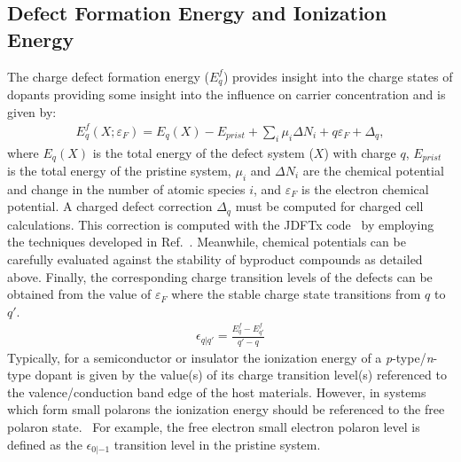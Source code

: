 \subsection{Defect Formation Energy and Ionization Energy}
The charge defect formation energy ($E^f_q$) provides insight into the charge states of dopants providing some insight into the influence on carrier concentration and is given by:
\begin{align}
    E^f_q(X; \varepsilon_F) = E_q(X) - E_{prist} + \sum_i \mu_i \Delta N_i + q \varepsilon_F + \Delta_q,
    \label{intro:eq:cfe}
\end{align}
where $E_q(X)$ is the total energy of the defect system ($X$) with charge $q$, $E_{prist}$ is the total energy of the pristine system, $\mu_i$ and $\Delta N_i$ are the chemical potential and change in the number of atomic species $i$, and $\varepsilon_F$ is the electron chemical potential. A charged defect correction $\Delta_q$ must be computed for charged cell calculations. This correction is computed with the JDFTx code~\cite{JDFTx} by employing the techniques developed in Ref.~\cite{wu2017first,ping2013}. Meanwhile, chemical potentials can be carefully evaluated against the stability of byproduct compounds as detailed above.
Finally, the corresponding charge transition levels of the defects can be obtained from the value of $\varepsilon_F$ where the stable charge state transitions from $q$ to $q'$.
\begin{align}
    \epsilon_{q|q'} = \frac{E^f_q - E^f_{q'}}{q' - q}
    \label{intro:eq:ctl}
\end{align}
Typically, for a semiconductor or insulator the ionization energy of a \textit{p}-type/\textit{n}-type dopant is given by the value(s) of its charge transition level(s) referenced to the valence/conduction band edge of the host materials. However, in systems which form small polarons the ionization energy should be referenced to the free polaron state.~\cite{smart2017effect,seo2018role} For example, the free electron small electron polaron level is defined as the $\epsilon_{0|-1}$ transition level in the pristine system.



